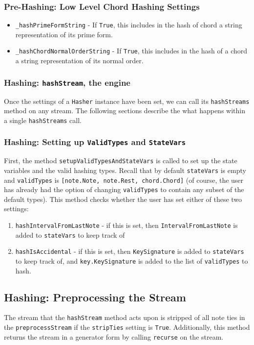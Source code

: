         \subsubsection{Pre-Hashing: Low Level Chord Hashing Settings}
                    \begin{itemize}
                    \item \texttt{\_hashPrimeFormString} - If \texttt{True}, this includes in the hash of chord a string representation of its prime form.
                    \item \texttt{\_hashChordNormalOrderString} - If \texttt{True}, this includes in the hash of a chord a string representation of its normal order. 
                    \end{itemize}
        \subsubsection{Hashing: \texttt{hashStream}, the engine}
        Once the settings of a \texttt{Hasher} instance have been set, we can call its \texttt{hashStreams} method on any stream. The following sections describe the what happens within a single \texttt{hashStreams} call. 
        \subsubsection{Hashing: Setting up \texttt{ValidTypes} and \texttt{StateVars}}
        First, the method \texttt{setupValidTypesAndStateVars} is called to set up the state variables and the valid hashing types. Recall that by default \texttt{stateVars} is empty and \texttt{validTypes} is \texttt{[note.Note, note.Rest, chord.Chord]} (of course, the user has already had the option of changing \texttt{validTypes} to contain any subset of the default types). This method checks whether the user has set either of these two settings:
        \begin{enumerate}
        \item \texttt{hashIntervalFromLastNote} - if this is set, then \texttt{IntervalFromLastNote} is added to \texttt{stateVars} to keep track of
        \item \texttt{hashIsAccidental} - if this is set, then \texttt{KeySignature} is added to \texttt{stateVars} to keep track of, and \texttt{key.KeySignature} is added to the list of \texttt{validTypes} to hash. 
        \end{enumerate}
        
        \subsection{Hashing: Preprocessing the Stream}
        The stream that the \texttt{hashStream} method acts upon is stripped of all note ties in the \texttt{preprocessStream} if the \texttt{stripTies} setting is \texttt{True}. Additionally, this method returns the stream in a generator form by calling \texttt{recurse} on the stream. 
        
